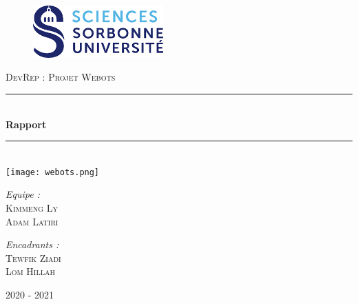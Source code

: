 \documentclass[a4paper,12pt]{article}
\newcommand{\HRule}{\rule{\linewidth}{0.5mm}}
\begin{document}
\begin{titlepage}
  \begin{sffamily}
  \begin{center}
    \begin{figure}[th]
	\includegraphics[width=5cm]{su.png}\hfill \vspace{1cm}
	\end{figure}  	
    \vspace{1cm}
    \textsc{\LARGE DevRep : Projet Webots}\\[2cm]
    \HRule \\[0.4cm]
    { \huge \bfseries Rapport \\[0.4cm] }

    \HRule \\[2cm]
    \texttt{[image: webots.png]} \vspace{1cm}
    \\[1cm]

    \begin{minipage}{0.4\textwidth}
      \begin{flushleft} \large
		\emph{Equipe :} \\        
        \textsc{Kimmeng Ly}\\
        \textsc{Adam Latiri}\\
      \end{flushleft}
    \end{minipage}
    \begin{minipage}{0.4\textwidth}
      \begin{flushright} \large
        \emph{Encadrants :} \\ 
        \textsc{Tewfik Ziadi}\\
        \textsc{Lom Hillah}
      \end{flushright}
    \end{minipage}

    \vfill

    {\large 2020 - 2021}

  \end{center}
  \end{sffamily}
\end{titlepage}
\newpage
\end{document}

